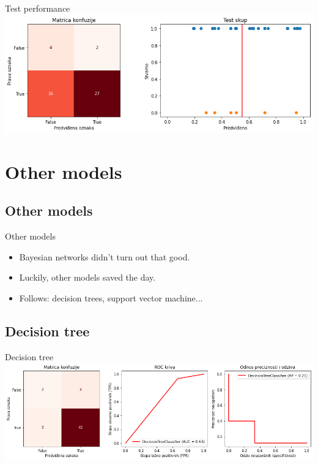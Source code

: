 \documentclass[hyperref={bookmarks=false}]{beamer}
\begin{document}
\begin{frame}{Test performance}
\includegraphics[width=\textwidth]{fixed2.png}
\end{frame}

\section{Other models}
\subsection{Other models}
\begin{frame}{Other models}
\begin{itemize}
    \item Bayesian networks didn't turn out that good.
    \item Luckily, other models saved the day.
    \item Follows: decision trees, support vector machine...
\end{itemize}
\end{frame}

\subsection{Decision tree}
\begin{frame}{Decision tree}
\includegraphics[width=\textwidth]{tree.png}
\end{frame}
\end{document}
